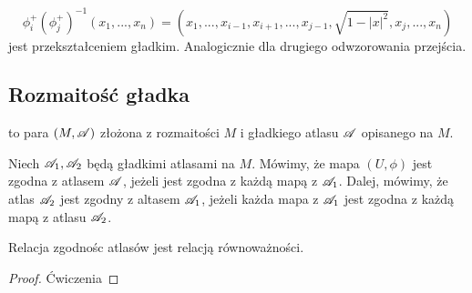 \begin{center}\end{center}

$$\phi_i^+(\phi_j^+)^{-1}(x_1,...,x_n)=(x_1,...,x_{i-1}, x_{i+1},...,x_{j-1},\sqrt{1-|x|^2},x_j,...,x_n)$$
jest przekształceniem gładkim. Analogicznie dla drugiego odwzorowania przejścia.

\subsection{Rozmaitość gładka}

\begin{definition}
     to para $(M, \mathcal{A})$ złożona z rozmaitości $M$ i gładkiego atlasu $\mathcal{A}$ opisanego na $M$.
\end{definition}

\begin{definition}
    Niech $\mathcal{A}_1,\mathcal{A}_2$ będą gładkimi atlasami na $M$.
    Mówimy, że mapa $(U, \phi)$ jest zgodna z atlasem $\mathcal{A}$, jeżeli jest zgodna z każdą mapą z $\mathcal{A}_1$. Dalej, mówimy, że atlas $\mathcal{A}_2$ jest zgodny z altasem $\mathcal{A}_1$, jeżeli każda mapa z $\mathcal{A}_1$ jest zgodna z każdą mapą z atlasu $\mathcal{A}_2$.
\end{definition}

%
%

\begin{theorem}
    Relacja zgodnośc atlasów jest relacją równoważności.
\begin{proof}
Ćwiczenia
\end{proof}
\end{theorem}

